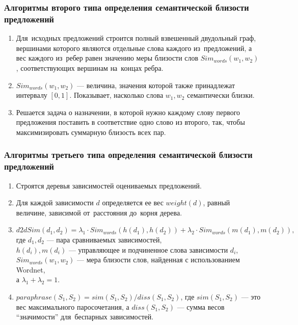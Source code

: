 \documentclass{beamer}
\begin{document}
\begin{frame}
\frametitle{Алгоритмы второго типа определения семантической близости предложений}

\begin{enumerate}
\item{
Для~исходных предложений строится полный взвешенный двудольный граф, 
вершинами которого являются отдельные слова каждого из~предложений, 
а вес каждого из~ребер равен значению меры близости слов $Sim_{words}(w_1, w_2)$,
соответствующих вершинам на~концах ребра. 
}
\item{
$Sim_{words}(w_1, w_2)$ --- величина, значения которой также принадлежат интервалу $[0,1]$.
Показывает, насколько слова $w_1,w_2$ семантически близки.
}
\item{
Решается задача о назначении, в которой
нужно каждому слову первого предложения поставить в соответствие одно слово из второго,
так, чтобы максимизировать суммарную близость всех пар.
}
\end{enumerate}

\end{frame}

\begin{frame}
\frametitle{Алгоритмы третьего типа определения семантической близости предложений}

\begin{enumerate}

\item {
Строятся деревья зависимостей оцениваемых предложений.
}

\item {
Для каждой зависимости $d$ определяется ее  вес $weight(d)$, равный величине,  
зависимой от~расстояния до~корня дерева.
}

\item{
$d2dSim(d_1,d_2) = \lambda_1 \cdot Sim_{words}(h(d_1),h(d_2)) + \lambda_2 \cdot Sim_{words}(m(d_1),m(d_2)), $
где $d_1, d_2$ --- пара сравниваемых зависимостей,\\
$h(d_i), m(d_i)$ --- управляющее и подчиненное слова зависимости $d_i$,\\
$Sim_{words}(w_1,w_2)$ --- мера близости слов, найденная с использованием Wordnet,\\
а $\lambda_1 + \lambda_2 = 1$.
}

\item{
$paraphrase(S_1, S_2) = sim(S_1,S_2)/diss(S_1, S_2)$, 
где $sim(S_1, S_2)$ --- это вес максимального паросочетания,
а $diss(S_1, S_2)$ --- сумма весов ``значимости'' для~беспарных зависимостей.
}
\end{enumerate}

\end{frame}
\end{document}
